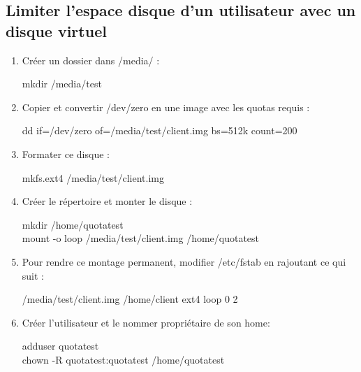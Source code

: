 \documentclass[a4paper]{article}
\begin{document}
\subsection{Limiter l'espace disque d'un utilisateur avec un disque virtuel}
\begin{enumerate}
    \item Créer un dossier dans /media/ :
    \begin{example}
    mkdir /media/test
    \end{example}
    \item Copier et convertir /dev/zero en une image avec les quotas requis :
    \begin{example}
    dd if=/dev/zero of=/media/test/client.img bs=512k count=200
    \end{example}
    \item Formater ce disque :
    \begin{example}
    mkfs.ext4 /media/test/client.img
    \end{example}
    \item Créer le répertoire et monter le disque :\
    \begin{example}
    mkdir /home/quotatest\\ mount -o loop /media/test/client.img /home/quotatest
    \end{example}
    \item Pour rendre ce montage permanent, modifier /etc/fstab en rajoutant ce qui suit :
    \begin{example}
    /media/test/client.img /home/client ext4 loop 0 2
    \end{example}
    \item Créer l'utilisateur et le nommer propriétaire de son home:
    \begin{example}
    adduser quotatest\\
    chown -R quotatest:quotatest /home/quotatest
    \end{example}
\end{enumerate}
\end{document}
